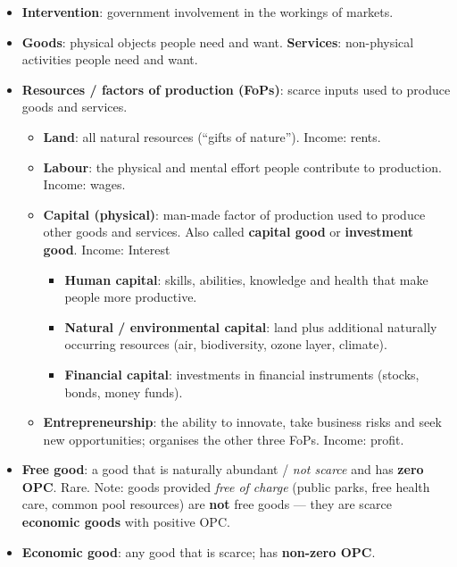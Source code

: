 \documentclass[a4paper,12pt]{article}
\begin{document}
\begin{itemize}
  \item \textbf{Intervention}: government involvement in the workings of markets.
  \item \textbf{Goods}: physical objects people need and want. \textbf{Services}: non-physical activities people need and want.
  \item \textbf{Resources / factors of production (FoPs)}: scarce inputs used to produce goods and services.
  \begin{itemize}
    \item \textbf{Land}: all natural resources (``gifts of nature''). Income: rents.
    \item \textbf{Labour}: the physical and mental effort people contribute to production. Income: wages.
    \item \textbf{Capital (physical)}: man-made factor of production used to produce other goods and services. Also called \textbf{capital good} or \textbf{investment good}. Income: Interest
    \begin{itemize}
      \item \textbf{Human capital}: skills, abilities, knowledge and health that make people more productive.
      \item \textbf{Natural / environmental capital}: land plus additional naturally occurring resources (air, biodiversity, ozone layer, climate).
      \item \textbf{Financial capital}: investments in financial instruments (stocks, bonds, money funds).
    \end{itemize}
    \item \textbf{Entrepreneurship}: the ability to innovate, take business risks and seek new opportunities; organises the other three FoPs. Income: profit.
  \end{itemize}
  \item \textbf{Free good}: a good that is naturally abundant / \textit{not scarce} and has \textbf{zero OPC}. Rare. Note: goods provided \textit{free of charge} (public parks, free health care, common pool resources) are \textbf{not} free goods --- they are scarce \textbf{economic goods} with positive OPC.
  \item \textbf{Economic good}: any good that is scarce; has \textbf{non-zero OPC}.
\end{itemize}
\end{document}
